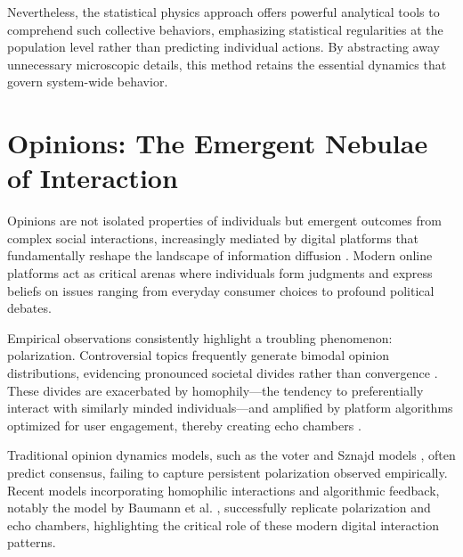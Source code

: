Nevertheless, the statistical physics approach offers powerful analytical tools to comprehend such collective behaviors, emphasizing statistical regularities at the population level rather than predicting individual actions. By abstracting away unnecessary microscopic details, this method retains the essential dynamics that govern system-wide behavior.

\section{Opinions: The Emergent Nebulae of Interaction}

Opinions are not isolated properties of individuals but emergent outcomes from complex social interactions, increasingly mediated by digital platforms that fundamentally reshape the landscape of information diffusion \cite{social-media-as-public-opinion}. Modern online platforms act as critical arenas where individuals form judgments and express beliefs on issues ranging from everyday consumer choices to profound political debates.

Empirical observations consistently highlight a troubling phenomenon: polarization. Controversial topics frequently generate bimodal opinion distributions, evidencing pronounced societal divides rather than convergence \cite{biased-assimilation-and-attitude-polarization, paritisans-without-constrait-political-polarization-and-trends}. These divides are exacerbated by homophily—the tendency to preferentially interact with similarly minded individuals—and amplified by platform algorithms optimized for user engagement, thereby creating echo chambers \cite{echo-chambers-online, echo-chambers-emotional-contagion-and-group-polarization-on-facebook, quantifying-echo-chamber-effects-in-information-spreading-over-political-communication, link-recommendation-algorithms-and-dynamics-of-polarization-in-social-networks}.

Traditional opinion dynamics models, such as the voter and Sznajd models \cite{the-voter-model, reality-inspired-voter-models-a-mini-review, opinion-evolution-in-closed-community, sznajd-review}, often predict consensus, failing to capture persistent polarization observed empirically. Recent models incorporating homophilic interactions and algorithmic feedback, notably the model by Baumann et al. \cite{modeling-echo-chambers-and-polarizaiton-dynamics-in-social-networks}, successfully replicate polarization and echo chambers, highlighting the critical role of these modern digital interaction patterns.

